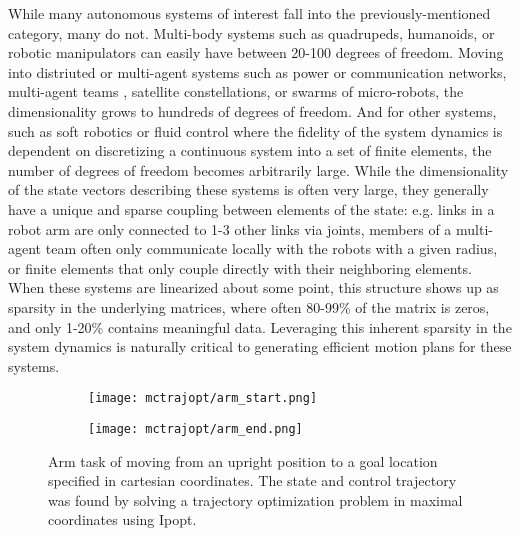 \documentclass[../root.tex]{subfiles}
\begin{document}
While many autonomous systems of interest fall into the previously-mentioned category, many
do not. Multi-body systems such as quadrupeds, humanoids, or robotic manipulators can easily
have between 20-100 degrees of freedom. Moving into distriuted or multi-agent systems such
as power or communication networks, multi-agent teams \cite{jackson_Scalable_2020}, 
satellite constellations, or swarms 
of micro-robots, the dimensionality grows to hundreds of degrees of freedom. And for other
systems, such as soft robotics or fluid control where the fidelity of the system dynamics is
dependent on discretizing a continuous system into a set of finite elements, the number of 
degrees of freedom becomes arbitrarily large. While the dimensionality of the state vectors
describing these systems is often very large, they generally have a unique and sparse coupling
between elements of the state: e.g. links in a robot arm are only connected to 1-3 other 
links via joints, members of a multi-agent team often only communicate locally with the 
robots with a given radius, or finite elements that only couple directly with their 
neighboring elements. When these systems are linearized about some point, this structure 
shows up as sparsity in the underlying matrices, where often 80-99\% of the matrix is zeros,
and only 1-20\% contains meaningful data. Leveraging this inherent sparsity in the system 
dynamics is naturally critical to generating efficient motion plans for these systems.

\begin{figure}[t]
    \centering
    \begin{subfigure}{0.48\columnwidth}
        \texttt{[image: mctrajopt/arm\_start.png]} 
    \end{subfigure}
    \begin{subfigure}{0.48\columnwidth}
        \texttt{[image: mctrajopt/arm\_end.png]} 
    \end{subfigure}
    \caption{Arm task of moving from an upright position to a goal location specified in 
        cartesian coordinates. The state and control trajectory was found by solving a 
        trajectory optimization problem in maximal coordinates using Ipopt.
    }
\end{figure}
\end{document}

